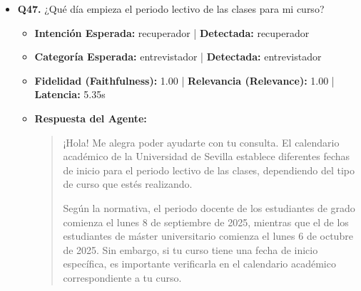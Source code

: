 \documentclass[12pt,a4paper,oneside]{report}
\begin{document}
\begin{itemize}
\begin{itemize}
\begin{itemize}
                  \item R.R. NORMAS DE MATRICULA GRADO Y MASTER UNIVERSITARIO 2025-2026.pdf (Página 29)
                  \item \href{https://educacion.us.es/el-centro/secretaria-administracion/secretaria/103-el-centro/1-2-secretaria-administracion/1-2-0-secretaria-del-centro/691-preguntas-frecuentes-secretaria}{PREGUNTAS FRECUENTES SECRETARÍA - Facultad de CC de la...}
                \end{itemize}
        \end{itemize}

  
\item \textbf{Q47.} ¿Qué día empieza el periodo lectivo de las clases para mi curso? \\
        \begin{itemize}
          \item \textbf{Intención Esperada:} recuperador | \textbf{Detectada:} recuperador
          \item \textbf{Categoría Esperada:} entrevistador | \textbf{Detectada:} entrevistador
          \item \textbf{Fidelidad (Faithfulness):} 1.00 | \textbf{Relevancia (Relevance):} 1.00 | \textbf{Latencia:} 5.35s
          \item \textbf{{Respuesta del Agente:}} \\
                \begin{quote}
¡Hola! Me alegra poder ayudarte con tu consulta. El calendario académico de la Universidad de Sevilla establece diferentes fechas de inicio para el periodo lectivo de las clases, dependiendo del tipo de curso que estés realizando.

Según la normativa, el periodo docente de los estudiantes de grado comienza el lunes 8 de septiembre de 2025, mientras que el de los estudiantes de máster universitario comienza el lunes 6 de octubre de 2025. Sin embargo, si tu curso tiene una fecha de inicio específica, es importante verificarla en el calendario académico correspondiente a tu curso.


\end{quote}
\end{itemize}
\end{itemize}
\end{document}
